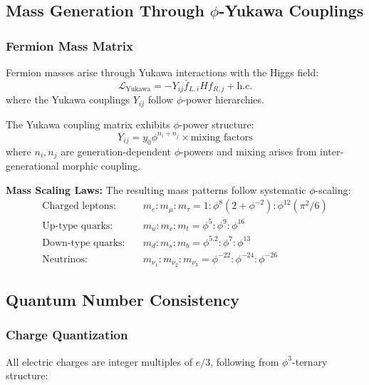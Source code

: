 \subsection{Mass Generation Through $\phi$-Yukawa Couplings}

\subsubsection{Fermion Mass Matrix}

Fermion masses arise through Yukawa interactions with the Higgs field:
\begin{equation}
\mathcal{L}_{\text{Yukawa}} = -Y_{ij} \bar{f}_{L,i} H f_{R,j} + \text{h.c.}
\end{equation}
where the Yukawa couplings $Y_{ij}$ follow $\phi$-power hierarchies.

\begin{theorem}
The Yukawa coupling matrix exhibits $\phi$-power structure:
\begin{equation}
Y_{ij} = y_0 \phi^{n_i + n_j} \times \text{mixing factors}
\end{equation}
where $n_i, n_j$ are generation-dependent $\phi$-powers and mixing arises from inter-generational morphic coupling.
\end{theorem}

\textbf{Mass Scaling Laws:}
The resulting mass patterns follow systematic $\phi$-scaling:
\begin{align}
\text{Charged leptons:} &\quad m_e : m_\mu : m_\tau = 1 : \phi^8(2+\phi^{-2}) : \phi^{12}(\pi^2/6)\\
\text{Up-type quarks:} &\quad m_u : m_c : m_t = \phi^5 : \phi^9 : \phi^{16}\\
\text{Down-type quarks:} &\quad m_d : m_s : m_b = \phi^{5.2} : \phi^7 : \phi^{13}\\
\text{Neutrinos:} &\quad m_{\nu_1} : m_{\nu_2} : m_{\nu_3} = \phi^{-22} : \phi^{-24} : \phi^{-26}
\end{align}

\subsection{Quantum Number Consistency}

\subsubsection{Charge Quantization}

All electric charges are integer multiples of $e/3$, following from $\phi^3$-ternary structure:

